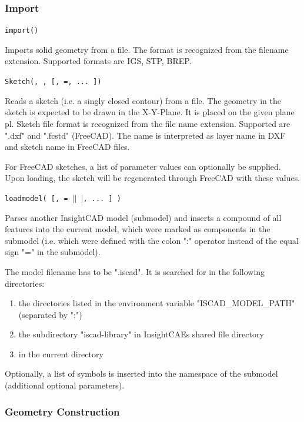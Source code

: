 \subsubsection{Import}

\texttt{import()}

Imports solid geometry from a file. The format is recognized from the
filename extension. Supported formats are IGS, STP, BREP.

\texttt{Sketch(, ,  [, =, ... ])}

Reads a sketch (i.e. a singly closed contour) from a file. The geometry in the
sketch is expected to be drawn in the X-Y-Plane.
It is placed on the given plane pl. 
Sketch file format is recognized from the file name extension. 
Supported are ".dxf" and ".fcstd" (FreeCAD). 
The name is interpreted as layer name in DXF and sketch name in FreeCAD files.

For FreeCAD sketches, a list of parameter values can optionally be supplied. 
Upon loading, the sketch will be regenerated through FreeCAD with these values.

\texttt{loadmodel(  [,  = $|$$|$ $|$, ... ] )}

Parses another InsightCAD model (submodel) and inserts a
compound of all features into the current model, which were marked as
components in the submodel (i.e. which were defined with the colon ":"
operator instead of the equal sign "=" in the submodel).

The model filename has to be ".iscad". It is searched
for in the following directories:

\begin{enumerate}
\item the directories listed in the environment variable
    "ISCAD\_MODEL\_PATH" (separated by ":")
\item the subdirectory "iscad-library" in InsightCAEs shared file
    directory
\item in the current directory
\end{enumerate}

Optionally, a list of symbols is inserted into the namespace of the
submodel (additional optional parameters).

\subsubsection{Geometry Construction}

